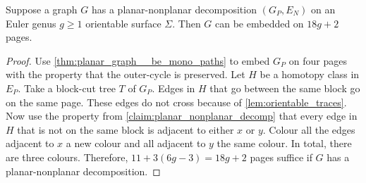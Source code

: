 \begin{lemma}\label{lem:planar_nonplanar_orientable}
	Suppose a graph \(G\) has a planar-nonplanar decomposition \((G_P, E_N)\) on an Euler genus $g \geq 1$ orientable surface \(\Sigma\). Then \(G\) can be embedded on \(18g + 2\) pages.
\end{lemma}
\begin{proof}
	Use \cref{thm:planar_graph__be_mono_paths} to embed $G_P$ on four pages with the property that the outer-cycle is preserved. Let $H$ be a homotopy class in $E_P$.
	Take a block-cut tree $T$ of $G_P$. Edges in $H$ that go between the same block go on the same page. These edges do not cross because of \cref{lem:orientable_traces}. Now use the property from \cref{claim:planar_nonplanar_decomp} that every edge in $H$ that is not on the same block is adjacent to either $x$ or $y$. Colour all the edges adjacent to $x$ a new colour and all adjacent to $y$ the same colour. In total, there are three colours. 
	Therefore, \(11 + 3(6g - 3) = 18g + 2\) pages suffice if \(G\) has a planar-nonplanar decomposition.
\end{proof}